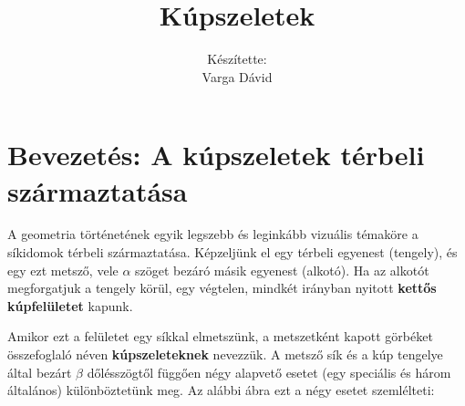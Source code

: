 \documentclass[12pt, a4paper]{article}
\newcommand{\textbfr}[1]{\textbf{\textcolor{bvred}{#1}}}
\begin{document}
\title{\textbfr{Kúpszeletek}}
\author{Készítette:\\Varga Dávid}
\date{}
\maketitle

\section*{Bevezetés: A kúpszeletek térbeli származtatása}

A geometria történetének egyik legszebb és leginkább vizuális témaköre a síkidomok térbeli származtatása. Képzeljünk el egy térbeli egyenest (tengely), és egy ezt metsző, vele $\alpha$ szöget bezáró másik egyenest (alkotó). Ha az alkotót megforgatjuk a tengely körül, egy végtelen, mindkét irányban nyitott \textbfr{kettős kúpfelületet} kapunk. 

Amikor ezt a felületet egy síkkal elmetszünk, a metszetként kapott görbéket összefoglaló néven \textbfr{kúpszeleteknek} nevezzük. A metsző sík és a kúp tengelye által bezárt $\beta$ dőlésszögtől függően négy alapvető esetet (egy speciális és három általános) különböztetünk meg. Az alábbi ábra ezt a négy esetet szemlélteti:
\end{document}
